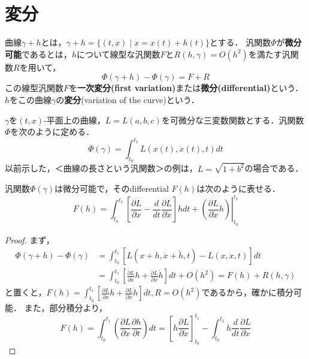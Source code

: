\documentclass[uplatex, dvipdfmx]{jsreport}
\begin{document}
\section{変分}

\begin{definition}
    曲線$\gamma+h$とは，$\gamma+h=\{(t,x)\mid x=x(t)+h(t)\}$とする．
    汎関数$\Phi$が\textbf{微分可能}であるとは，$h$について線型な汎関数$F$と$R(h,\gamma)=O(h^2)$を満たす汎関数$R$を用いて，
    \[ \Phi(\gamma+h)-\Phi(\gamma) = F+R \]
    この線型汎関数$F$を\textbf{一次変分(first variation)}または\textbf{微分(differential)}という．$h$をこの曲線$\gamma$の\textbf{変分}(variation of the curve)という．
\end{definition}
\begin{example}
    $\gamma$を$(t,x)$-平面上の曲線，$L=L(a,b,c)$を可微分な三変数関数とする．汎関数$\Phi$を次のように定める．
    \[ \Phi(\gamma) = \int^{t_1}_{t_0}L(x(t),\dot{x}(t),t)dt \]
    以前示した，＜曲線の長さという汎関数＞の例は，$L=\sqrt{1+b^2}$の場合である．
\end{example}

\begin{theorem}\label{thm-differential-of-action-functional}
    汎関数$\Phi(\gamma)$は微分可能で，そのdifferential $F(h)$は次のように表せる．
    \[ F(h) = \int^{t_1}_{t_0}\left.\left[ \frac{\partial L}{\partial x}-\frac{d}{dt}\frac{\partial L}{\partial\dot{x}} \right]hdt+\left(\frac{\partial L}{\partial\dot{x}}h\right) \right|^{t_1}_{t_0} \]
\end{theorem}
\begin{proof}
    まず，
    \begin{align*}
        \Phi(\gamma+h)-\Phi(\gamma) &= \int^{t_1}_{t_0}\left[L(x+h,\dot{x}+\dot{h},t)-L(x,\dot{x},t)\right]dt\\
        &= \int^{t_1}_{t_0}\left[\frac{\partial L}{\partial x}h+\frac{\partial L}{\partial\dot{x}}\dot{h}\right]dt + O(h^2) = F(h) + R(h,\gamma)
    \end{align*}
    と置くと，$F(h)=\int^{t_1}_{t_0}\left[\frac{\partial L}{\partial x}h+\frac{\partial L}{\partial\dot{x}}\dot{h}\right]dt, R=O(h^2)$であるから，確かに積分可能．
    また，部分積分より，
    \[ F(h) = \int^{t_1}_{t_0}\left( \frac{\partial L}{\partial\dot{x}}\frac{\partial h}{\partial t} \right)dt = \left[ h\frac{\partial L}{\partial\dot{x}} \right]^{t_1}_{t_0} - \int^{t_1}_{t_0} h\frac{d}{dt}\frac{\partial L}{\partial\dot{x}} \]
\end{proof}
\end{document}
